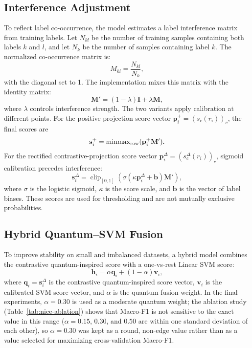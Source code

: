 \documentclass[runningheads]{llncs}
\begin{document}
\subsection{Interference Adjustment}
To reflect label co-occurrence, the model estimates a label interference matrix
from training labels. Let $N_{kl}$ be the number of training samples containing
both labels $k$ and $l$, and let $N_k$ be the number of samples containing label
$k$. The normalized co-occurrence matrix is:
\begin{equation}
    M_{kl} = \frac{N_{kl}}{N_k},
\end{equation}
with the diagonal set to 1. The implementation mixes this matrix with the
identity matrix:
\begin{equation}
    \mathbf{M}' = (1-\lambda)\mathbf{I} + \lambda\mathbf{M},
\end{equation}
where $\lambda$ controls interference strength. The two variants apply
calibration at different points. For the positive-projection score vector
$\mathbf{p}_i^{+}=(s_c(r_i))_c$, the final scores are
\begin{equation}
    \mathbf{s}_i^{+}=\operatorname{minmax}_{\rm row}
    (\mathbf{p}_i^{+}\mathbf{M}').
\end{equation}
For the rectified contrastive-projection score vector
$\mathbf{p}_i^{\Delta}=(s_c^{\Delta}(r_i))_c$, sigmoid calibration precedes
interference:
\begin{equation}
    \mathbf{s}_i^{\Delta}=\operatorname{clip}_{[0,1]}
    \!\left(\sigma(\kappa\mathbf{p}_i^{\Delta}+\mathbf{b})\mathbf{M}'\right),
\end{equation}
where $\sigma$ is the logistic sigmoid, $\kappa$ is the score scale, and
$\mathbf{b}$ is the vector of label biases. These scores are used for
thresholding and are not mutually exclusive
probabilities.

\subsection{Hybrid Quantum--SVM Fusion}
To improve stability on small and imbalanced datasets, a hybrid model combines
the contrastive quantum-inspired score with a one-vs-rest Linear SVM score:
\begin{equation}
    \mathbf{h}_i = \alpha \mathbf{q}_i + (1-\alpha)\mathbf{v}_i,
\end{equation}
where $\mathbf{q}_i=\mathbf{s}_i^{\Delta}$ is the contrastive
quantum-inspired score vector,
$\mathbf{v}_i$ is the calibrated SVM score vector, and $\alpha$ is the quantum
fusion weight. In the final experiments, $\alpha=0.30$ is used as a moderate
quantum weight; the ablation study (Table~\ref{tab:nice-ablation}) shows that
Macro-F1 is not sensitive to the exact value in this range ($\alpha=0.15$,
$0.30$, and $0.50$ are within one standard deviation of each other), so
$\alpha=0.30$ was kept as a round, non-edge value rather than as a value
selected for maximizing cross-validation Macro-F1.
\end{document}
